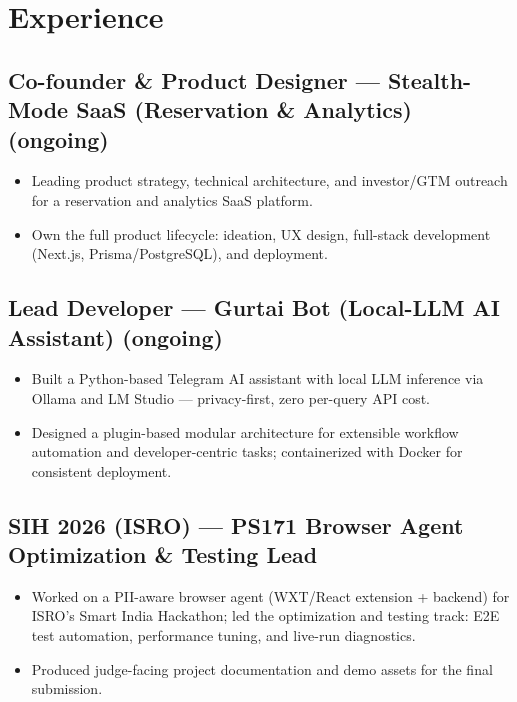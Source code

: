\documentclass[10pt]{article}
\begin{document}
\section{Experience}

\subsection{Co-founder \& Product Designer --- Stealth-Mode SaaS (Reservation \& Analytics) \hfill (ongoing)}
\begin{itemize}
  \item Leading product strategy, technical architecture, and investor/GTM outreach for a reservation and analytics SaaS platform.
  \item Own the full product lifecycle: ideation, UX design, full-stack development (Next.js, Prisma/PostgreSQL), and deployment.
\end{itemize}

\subsection{Lead Developer --- Gurtai Bot (Local-LLM AI Assistant) \hfill (ongoing)}
\begin{itemize}
  \item Built a Python-based Telegram AI assistant with local LLM inference via Ollama and LM Studio --- privacy-first, zero per-query API cost.
  \item Designed a plugin-based modular architecture for extensible workflow automation and developer-centric tasks; containerized with Docker for consistent deployment.
\end{itemize}

\subsection{SIH 2026 (ISRO) --- PS171 Browser Agent \hfill Optimization \& Testing Lead}
\begin{itemize}
  \item Worked on a PII-aware browser agent (WXT/React extension + backend) for ISRO's Smart India Hackathon; led the optimization and testing track: E2E test automation, performance tuning, and live-run diagnostics.
  \item Produced judge-facing project documentation and demo assets for the final submission.
\end{itemize}
\end{document}
